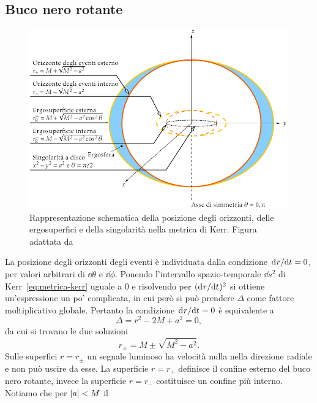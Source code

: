 \subsection{Buco nero rotante}
\label{sec:orizzonte-kerr}

\begin{figure}
  \centering
  \includegraphics[width=\textwidth]{figure/kerr}
  \caption{Rappresentazione schematica della posizione degli orizzonti, delle
    ergosuperfici e della singolarità nella metrica di Kerr.  Figura adattata
    da~\textcite{2007arXiv0706.0622V}}
  \label{fig:geometria-kerr}
\end{figure}
La posizione degli orizzonti degli eventi è individuata dalla condizione
\(\mathrm{d}^{}r / \mathrm{d} {t}^{} = 0\), per valori arbitrari di \(\dd\theta\) e \(\dd\phi\).
Ponendo l'intervallo spazio-temporale \(\dd s^{2}\) di
Kerr~\eqref{eq:metrica-kerr} uguale a \(0\) e risolvendo per
\((\mathrm{d}^{}r / \mathrm{d} {t}^{})^{2}\) si ottiene un'espressione un po' complicata, in cui però
si può prendere \(\Delta\) come fattore moltiplicativo globale.  Pertanto la
condizione \(\mathrm{d}^{}r / \mathrm{d} {t}^{} = 0\) è equivalente a
\begin{equation}
  \Delta = r^{2} - 2M + a^{2} = 0,
\end{equation}
da cui si trovano le due soluzioni
\begin{equation}
  r_{\pm} = M \pm \sqrt{M^{2} - a^{2}}.
\end{equation}
Sulle superfici \(r = r_{\pm}\) un segnale luminoso ha velocità nulla nella
direzione radiale e non può uscire da esse.  La superficie \(r = r_{+}\)
definisce il confine esterno del buco nero rotante, invece la superficie \(r =
r_{-}\) costituisce un confine più interno.  Notiamo che per \(\lvert a\rvert < M\) il
